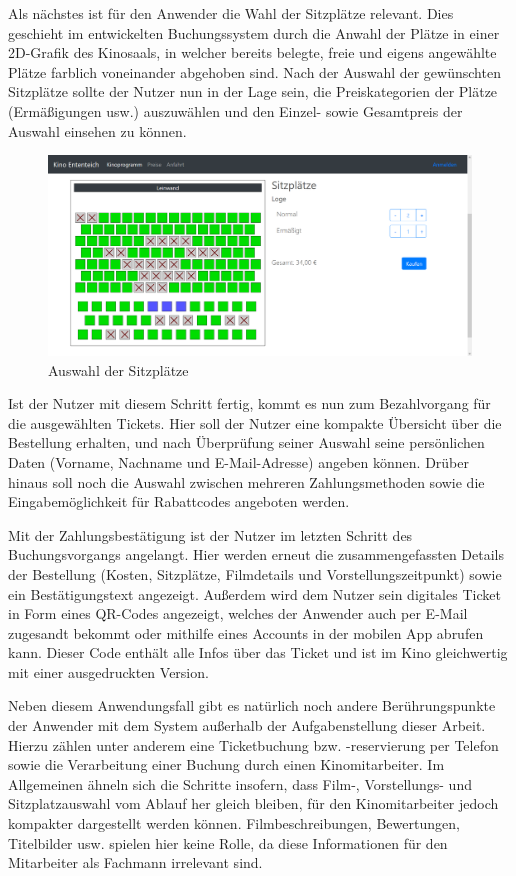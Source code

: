 Als nächstes ist für den Anwender die Wahl der Sitzplätze relevant.
Dies geschieht im entwickelten Buchungssystem durch die Anwahl der Plätze in einer 2D-Grafik des Kinosaals, in welcher bereits belegte, freie und eigens angewählte Plätze farblich voneinander abgehoben sind.
Nach der Auswahl der gewünschten Sitzplätze sollte der Nutzer nun in der Lage sein, die Preiskategorien der Plätze (Ermäßigungen usw.) auszuwählen und den Einzel- sowie Gesamtpreis der Auswahl einsehen zu können.

\begin{figure}[ht]
	\centering
	\includegraphics[width=\textwidth]{img/screenshots/vorstellung02}
	\captionsetup{format=hang}
	\caption{Auswahl der Sitzplätze}
	\label{fig:vorstellung02}
\end{figure}

Ist der Nutzer mit diesem Schritt fertig, kommt es nun zum Bezahlvorgang für die ausgewählten Tickets.
Hier soll der Nutzer eine kompakte Übersicht über die Bestellung erhalten, und nach Überprüfung seiner Auswahl seine persönlichen Daten (Vorname, Nachname und E-Mail-Adresse) angeben können.
Drüber hinaus soll noch die Auswahl zwischen mehreren Zahlungsmethoden sowie die Eingabemöglichkeit für Rabattcodes angeboten werden.

Mit der Zahlungsbestätigung ist der Nutzer im letzten Schritt des Buchungsvorgangs angelangt.
Hier werden erneut die zusammengefassten Details der Bestellung (Kosten, Sitzplätze, Filmdetails und Vorstellungszeitpunkt) sowie ein Bestätigungstext angezeigt.
Außerdem wird dem Nutzer sein digitales Ticket in Form eines \acs{QR-Code}s angezeigt, welches der Anwender auch per E-Mail zugesandt bekommt oder mithilfe eines Accounts in der mobilen App abrufen kann.
Dieser Code enthält alle Infos über das Ticket und ist im Kino gleichwertig mit einer ausgedruckten Version.

Neben diesem Anwendungsfall gibt es natürlich noch andere Berührungspunkte der Anwender mit dem System außerhalb der Aufgabenstellung dieser Arbeit.
Hierzu zählen unter anderem eine Ticketbuchung bzw. -reservierung per Telefon sowie die Verarbeitung einer Buchung durch einen Kinomitarbeiter.
Im Allgemeinen ähneln sich die Schritte insofern, dass Film-, Vorstellungs- und Sitzplatzauswahl vom Ablauf her gleich bleiben, für den Kinomitarbeiter jedoch kompakter dargestellt werden können.
Filmbeschreibungen, Bewertungen, Titelbilder usw. spielen hier keine Rolle, da diese Informationen für den Mitarbeiter als Fachmann irrelevant sind.